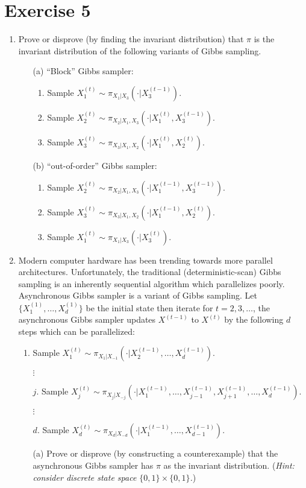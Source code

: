 
\section*{Exercise 5}
\begin{enumerate}
\item Prove or disprove (by finding the invariant distribution) that $\pi$ is the invariant distribution of the following variants of Gibbs sampling.

\begin{itemize}
\item[(a)] ``Block'' Gibbs sampler:
\begin{enumerate}
\item Sample $X_1^{(t)} \sim \pi_{X_1|X_3}\left(\cdot| X_3^{(t-1)}\right)$.
\item Sample $X_2^{(t)} \sim \pi_{X_2|X_1,X_3}\left(\cdot| X_1^{(t)}, X_3^{(t-1)}\right)$.
\item Sample $X_3^{(t)} \sim \pi_{X_3|X_1,X_2}\left(\cdot| X_1^{(t)}, X_2^{(t)}\right)$.
\end{enumerate}

\item[(b)] ``out-of-order'' Gibbs sampler:
\begin{enumerate}
\item Sample $X_2^{(t)} \sim \pi_{X_2|X_1,X_3}\left(\cdot| X_1^{(t-1)}, X_3^{(t-1)}\right)$.
\item Sample $X_3^{(t)} \sim \pi_{X_3|X_1,X_2}\left(\cdot| X_1^{(t-1)}, X_2^{(t)}\right)$.
\item Sample $X_1^{(t)} \sim \pi_{X_1|X_3}\left(\cdot| X_3^{(t)}\right)$.
\end{enumerate}
\end{itemize}

\item Modern computer hardware has been trending towards more parallel architectures. Unfortunately, the traditional (deterministic-scan) Gibbs sampling is an inherently sequential algorithm which parallelizes poorly. Asynchronous Gibbs sampler is a variant of Gibbs sampling. Let $\{X_1^{(1)}, \ldots, X_d^{(1)}\}$ be the initial state then iterate for $t = 2, 3, \ldots$, the asynchronous Gibbs sampler updates $X^{(t-1)}$ to $X^{(t)}$ by the following $d$ steps which can be parallelized:
\begin{enumerate}
\item Sample $X_1^{(t)} \sim \pi_{X_1|X_{-1}}\left(\cdot| X_2^{(t-1)}, \ldots, X_d^{(t-1)}\right)$.
\item[$\vdots$]
\item[$j$.] Sample $X_j^{(t)} \sim \pi_{X_j|X_{-j}}\left(\cdot| X_1^{(t-1)}, \ldots, X_{j-1}^{(t-1)}, X_{j+1}^{(t-1)}, \ldots, X_d^{(t-1)}\right)$.
\item[$\vdots$]
\item[$d$.] Sample $X_d^{(t)} \sim \pi_{X_d|X_{-d}}\left(\cdot| X_1^{(t-1)}, \ldots, X_{d-1}^{(t-1)}\right)$.
\end{enumerate}

\begin{itemize}
\item[(a)] Prove or disprove (by constructing a counterexample) that the asynchronous Gibbs sampler has $\pi$ as the invariant distribution. (\emph{Hint: consider discrete state space $\{0, 1\} \times \{0, 1\}$.})
\end{itemize}
\end{enumerate}
